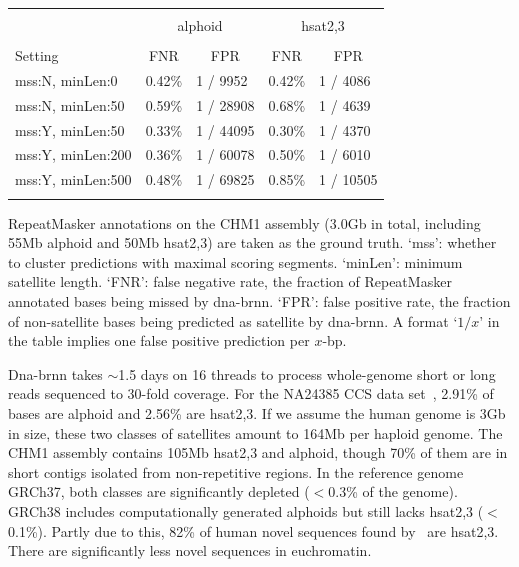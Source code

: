 \documentclass{bioinfo}
\begin{document}
\begin{table}[tb]
{\footnotesize
\begin{tabular}{p{3.3cm}rlrl}
\toprule\\[-1.5em]
& \multicolumn{2}{c}{\vspace{0.3em}alphoid} & \multicolumn{2}{c}{hsat2,3} \\
\cline{2-5}\\[-0.7em]
Setting & \multicolumn{1}{c}{FNR} & \multicolumn{1}{c}{FPR} & \multicolumn{1}{c}{FNR} & \multicolumn{1}{c}{FPR} \\[-0.5em]
\midrule
mss:N, minLen:0 & 0.42\% & 1 / 9952  & 0.42\% & 1 / 4086 \\
mss:N, minLen:50& 0.59\% & 1 / 28908 & 0.68\% & 1 / 4639 \\
mss:Y, minLen:50& 0.33\% & 1 / 44095 & 0.30\% & 1 / 4370 \\
mss:Y, minLen:200&0.36\% & 1 / 60078 & 0.50\% & 1 / 6010 \\
mss:Y, minLen:500&0.48\% & 1 / 69825 & 0.85\% & 1 / 10505 \\
\botrule
\end{tabular}
}{RepeatMasker annotations on the CHM1 assembly (3.0Gb in total, including 55Mb alphoid and 50Mb hsat2,3)
are taken as the ground truth. `mss': whether to cluster
predictions with maximal scoring segments.  `minLen': minimum satellite length.
`FNR': false negative rate, the fraction of RepeatMasker annotated bases being missed
by dna-brnn. `FPR': false positive rate, the fraction of non-satellite bases
being predicted as satellite by dna-brnn. A format `$1/x$' in the table implies
one false positive prediction per $x$-bp.}\label{tab:eval}
\end{table}

Dna-brnn takes $\sim$1.5 days on 16 threads to process whole-genome short or long
reads sequenced to 30-fold coverage. For the NA24385 CCS data
set~\citep{Wenger519025}, 2.91\% of bases are alphoid and 2.56\% are hsat2,3.
If we assume the human genome is 3Gb in size, these two classes of satellites
amount to 164Mb per haploid genome. The CHM1 assembly
contains 105Mb hsat2,3 and alphoid, though 70\% of them are in short
contigs isolated from non-repetitive regions. In the reference
genome GRCh37, both classes are significantly depleted ($<$0.3\% of the
genome).  GRCh38 includes computationally generated alphoids but still lacks
hsat2,3 ($<$0.1\%). Partly due to this, 82\% of human novel sequences found
by~\citet{Sherman:2018aa} are hsat2,3.  There are significantly less novel
sequences in euchromatin.
\end{document}
